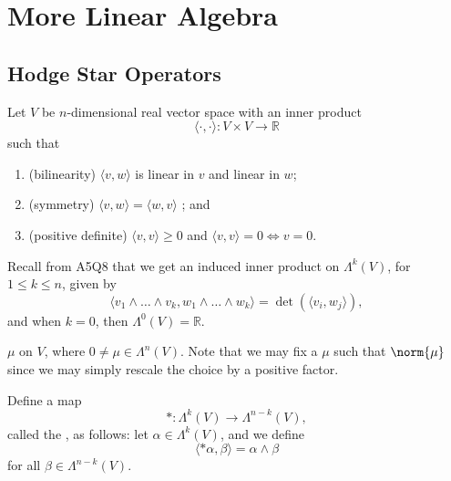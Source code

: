 \documentclass[notoc,notitlepage]{tufte-book}
\begin{document}
\section{More Linear Algebra}%
\label{sec:more_linear_algebra}

\subsection{Hodge Star Operators}%
\label{sub:hodge_star_operators}

Let $V$ be $n$-dimensional real vector space with an inner product
\begin{equation*}
  \langle \cdot, \cdot \rangle : V \times V \to \mathbb{R}
\end{equation*}
such that
\begin{enumerate}
  \item (bilinearity) $\langle v, w \rangle$ is linear in $v$ and linear in $w$;
  \item (symmetry) $\langle v, w \rangle = \langle w, v \rangle$ ; and
  \item (positive definite) $\langle v, v \rangle \geq 0$ and $\langle v, v
    \rangle = 0 \iff v = 0$.
\end{enumerate}

Recall from A5Q8 that we get an induced inner product on $\Lambda^k(V)$, for $1
\leq k \leq n$, given by
\begin{equation*}
  \langle v_1 \land \hdots \land v_k, w_1 \land \hdots \land w_k \rangle = \det
  (\langle v_i, w_j \rangle),
\end{equation*}
and when $k = 0$, then $\Lambda^0(V) = \mathbb{R}$.

 $\mu$ on $V$, where $0 \neq \mu \in
\Lambda^n(V)$. Note that we may fix a $\mu$ such that $\norm{\mu}$ since we may
simply rescale the choice by a positive factor.

\begin{defn}\label{defn:hodge_star_operator}
  Define a map
  \begin{equation*}
    * : \Lambda^k(V) \to \Lambda^{n-k}(V),
  \end{equation*}
  called the , as follows: let $\alpha \in
  \Lambda^k(V)$, and we define
  \begin{equation*}
    \langle * \alpha, \beta \rangle = \alpha \land \beta
  \end{equation*}
  for all $\beta \in \Lambda^{n-k}(V)$.
\end{defn}
\end{document}
